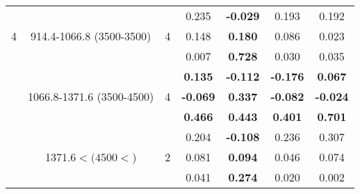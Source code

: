 \begin{table}[htbp]
\begin{tabular}{rrrcccc}
    \multicolumn{1}{c}{\multirow{3}[2]{*}{4}} & \multicolumn{1}{c}{\multirow{3}[2]{2.5cm}{914.4-1066.8 (3500-3500)}} & \multicolumn{1}{c}{\multirow{3}[2]{*}{4}} & 0.235  & \textbf{-0.029 } & 0.193  & 0.192  \\
    \multicolumn{1}{c}{} & \multicolumn{1}{c}{} & \multicolumn{1}{c}{} & 0.148  & \textbf{0.180 } & 0.086  & 0.023  \\
    \multicolumn{1}{c}{} & \multicolumn{1}{c}{} & \multicolumn{1}{c}{} & 0.007  & \textbf{0.728 } & 0.030  & 0.035  \bigstrut\\\cline{4-7}\noalign{\smallskip}
    \multicolumn{1}{c}{\multirow{3}[2]{*}{5}} & \multicolumn{1}{c}{\multirow{3}[2]{2.5cm}{1066.8-1371.6 (3500-4500)}} & \multicolumn{1}{c}{\multirow{3}[2]{*}{4}} & \textbf{0.135 } & \textbf{-0.112 } & \textbf{-0.176 } & \textbf{0.067 } \\
    \multicolumn{1}{c}{} & \multicolumn{1}{c}{} & \multicolumn{1}{c}{} & \textbf{-0.069 } & \textbf{0.337 } & \textbf{-0.082 } & \textbf{-0.024 } \\
    \multicolumn{1}{c}{} & \multicolumn{1}{c}{} & \multicolumn{1}{c}{} & \textbf{0.466 } & \textbf{0.443 } & \textbf{0.401 } & \textbf{0.701 } \bigstrut\\\cline{4-7}\noalign{\smallskip}
    \multicolumn{1}{c}{\multirow{3}[2]{*}{6}} & \multicolumn{1}{c}{\multirow{3}[2]{2.5cm}{1371.6$< (4500<$)}} & \multicolumn{1}{c}{\multirow{3}[2]{*}{2}} & 0.204  & \textbf{-0.108 } & 0.236  & 0.307  \\
    \multicolumn{1}{c}{} & \multicolumn{1}{c}{} & \multicolumn{1}{c}{} & 0.081  & \textbf{0.094 } & 0.046  & 0.074  \\
    \multicolumn{1}{c}{} & \multicolumn{1}{c}{} & \multicolumn{1}{c}{} & 0.041  & \textbf{0.274 } & 0.020  & 0.002  \\
    \bottomrule
    \end{tabular}%
  \label{tab:Set2TVJD}%
\end{table}%
